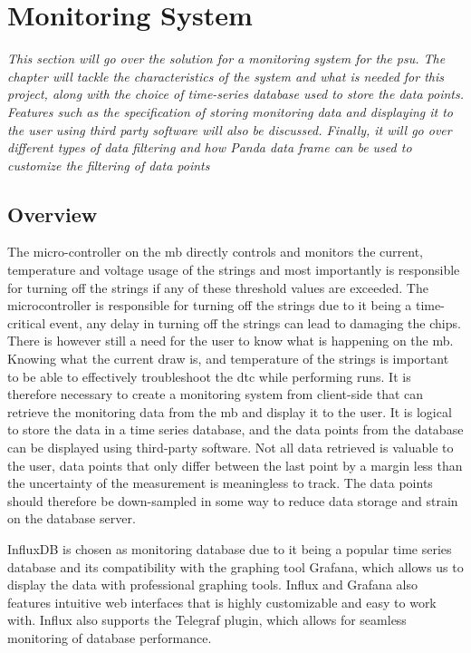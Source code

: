 \documentclass[main.tex]{subfiles}
\begin{document}
\section{Monitoring System}
\label{section: monitoring}
\textit{This section will go over the solution for a monitoring system for the \gls{psu}. The chapter will tackle the characteristics of the system and what is needed for this project, along with the choice of time-series database used to store the data points. Features such as the specification of storing monitoring data and displaying it to the user using third party software will also be discussed. Finally, it will go over different types of data filtering and how Panda data frame can be used to customize the filtering of data points }

\subsection{Overview}

 The micro-controller on the \gls{mb} directly controls and monitors the current, temperature and voltage usage of the strings and most importantly is responsible for turning off the strings if any of these threshold values are exceeded. The microcontroller is responsible for turning off the strings due to it being a time-critical event, any delay in turning off the strings can lead to damaging the chips. There is however still a need for the user to know what is happening on the \gls{mb}. Knowing what the current draw is, and temperature of the strings is important to be able to effectively troubleshoot the \gls{dtc} while performing runs. It is therefore necessary to create a monitoring system from client-side that can retrieve the monitoring data from the \gls{mb} and display it to the user. It is logical to store the data in a time series database, and the data points from the database can be displayed using third-party software. Not all data retrieved is valuable to the user, data points that only differ between the last point by a margin less than the uncertainty of the measurement is meaningless to track. The data points should therefore be down-sampled in some way to reduce data storage and strain on the database server.

 InfluxDB is chosen as monitoring database due to it being a popular time series database and its compatibility with the graphing tool Grafana, which allows us to display the data with professional graphing tools. Influx and Grafana also features intuitive web interfaces that is highly customizable and easy to work with. Influx also supports the Telegraf plugin, which allows for seamless monitoring of database performance. 
 
\end{document}
